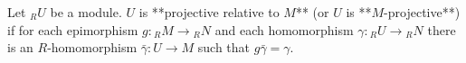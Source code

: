 Let ${}_R U$ be a module. $U$ is **projective relative to $M$** (or $U$ is **$M$-projective**) if for each epimorphism $g: {}_R M \to {}_R N$ and each homomorphism $\gamma: {}_R U \to {}_R N$ there is an $R$-homomorphism $\bar{\gamma}: U \to M$ such that $g \bar{\gamma} = \gamma$.
